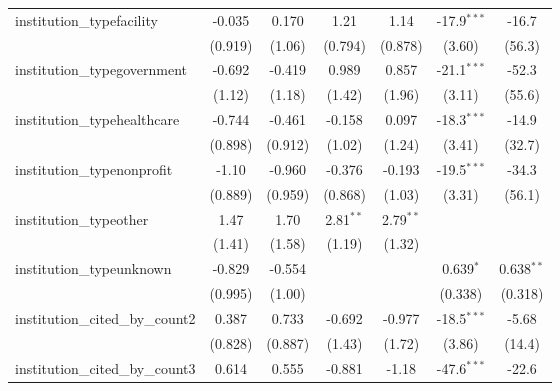 \begin{tabular}{lcccccc}
   institution\_typefacility             & -0.035        & 0.170         & 1.21          & 1.14          & -17.9$^{***}$ & -16.7\\   
                                         & (0.919)       & (1.06)        & (0.794)       & (0.878)       & (3.60)        & (56.3)\\   
   institution\_typegovernment           & -0.692        & -0.419        & 0.989         & 0.857         & -21.1$^{***}$ & -52.3\\   
                                         & (1.12)        & (1.18)        & (1.42)        & (1.96)        & (3.11)        & (55.6)\\   
   institution\_typehealthcare           & -0.744        & -0.461        & -0.158        & 0.097         & -18.3$^{***}$ & -14.9\\   
                                         & (0.898)       & (0.912)       & (1.02)        & (1.24)        & (3.41)        & (32.7)\\   
   institution\_typenonprofit            & -1.10         & -0.960        & -0.376        & -0.193        & -19.5$^{***}$ & -34.3\\   
                                         & (0.889)       & (0.959)       & (0.868)       & (1.03)        & (3.31)        & (56.1)\\   
   institution\_typeother                & 1.47          & 1.70          & 2.81$^{**}$   & 2.79$^{**}$   &               &   \\   
                                         & (1.41)        & (1.58)        & (1.19)        & (1.32)        &               &   \\   
   institution\_typeunknown              & -0.829        & -0.554        &               &               & 0.639$^{*}$   & 0.638$^{**}$\\   
                                         & (0.995)       & (1.00)        &               &               & (0.338)       & (0.318)\\   
   institution\_cited\_by\_count2        & 0.387         & 0.733         & -0.692        & -0.977        & -18.5$^{***}$ & -5.68\\   
                                         & (0.828)       & (0.887)       & (1.43)        & (1.72)        & (3.86)        & (14.4)\\   
   institution\_cited\_by\_count3        & 0.614         & 0.555         & -0.881        & -1.18         & -47.6$^{***}$ & -22.6\\   

\end{tabular}
